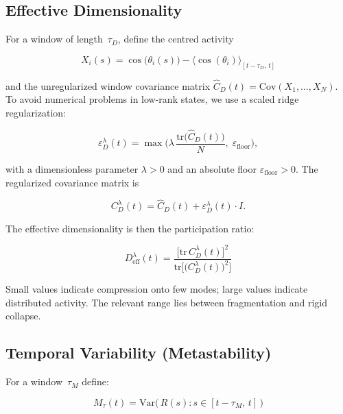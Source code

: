 \documentclass[11pt,a4paper]{article}
\theoremstyle{plain}
\theoremstyle{definition}
\theoremstyle{remark}
\newcommand{\Deff}{D_{\mathrm{eff}}}
\newcommand{\Mtau}{M_{\tau}}
\begin{document}
\subsection{Effective Dimensionality}

For a window of length~$\tau_D$, define the centred activity

\begin{equation}
X_i(s) = \cos\!\bigl(\theta_i(s)\bigr) - \bigl\langle\cos(\theta_i)\bigr\rangle_{[t-\tau_D,\,t]}
\end{equation}

and the unregularized window covariance matrix $\hat{C}_D(t) = \mathrm{Cov}(X_1,\ldots,X_N)$. To avoid numerical problems in low-rank states, we use a scaled ridge regularization:

\begin{equation}
\label{eq:ridge}
\varepsilon_D^{\lambda}(t) = \max\!\biggl(\lambda\,\frac{\mathrm{tr}\bigl(\hat{C}_D(t)\bigr)}{N},\;\varepsilon_{\mathrm{floor}}\biggr),
\end{equation}

with a dimensionless parameter $\lambda > 0$ and an absolute floor $\varepsilon_{\mathrm{floor}} > 0$. The regularized covariance matrix is

\begin{equation}
C_D^{\lambda}(t) = \hat{C}_D(t) + \varepsilon_D^{\lambda}(t)\cdot I.
\end{equation}

The effective dimensionality is then the participation ratio:

\begin{equation}
\label{eq:Deff}
\boxed{\;\Deff^{\lambda}(t) = \frac{\bigl[\mathrm{tr}\,C_D^{\lambda}(t)\bigr]^2}{\mathrm{tr}\!\bigl[\bigl(C_D^{\lambda}(t)\bigr)^2\bigr]}\;}
\end{equation}

Small values indicate compression onto few modes; large values indicate distributed activity. The relevant range lies between fragmentation and rigid collapse.

\subsection{Temporal Variability (Metastability)}

For a window~$\tau_M$ define:

\begin{equation}
\label{eq:Mtau}
\Mtau(t) = \mathrm{Var}\!\bigl(\,R(s) : s \in [t - \tau_M,\, t]\,\bigr)
\end{equation}
\end{document}
